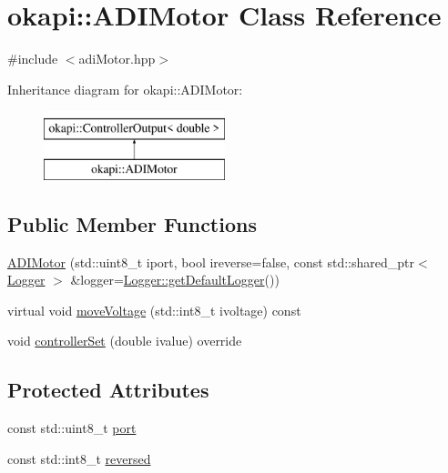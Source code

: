 \hypertarget{classokapi_1_1ADIMotor}{}\section{okapi\+::A\+D\+I\+Motor Class Reference}
\label{classokapi_1_1ADIMotor}


{\ttfamily \#include $<$adi\+Motor.\+hpp$>$}

Inheritance diagram for okapi\+::A\+D\+I\+Motor\+:\begin{figure}[H]
\begin{center}
\leavevmode
\includegraphics[height=2.000000cm]{classokapi_1_1ADIMotor}
\end{center}
\end{figure}
\subsection*{Public Member Functions}
\begin{DoxyCompactItemize}
\item 
\mbox{\hyperlink{classokapi_1_1ADIMotor_a44abc0f7804cc45e2ad98a54d4fea920}{A\+D\+I\+Motor}} (std\+::uint8\+\_\+t iport, bool ireverse=false, const std\+::shared\+\_\+ptr$<$ \mbox{\hyperlink{classokapi_1_1Logger}{Logger}} $>$ \&logger=\mbox{\hyperlink{classokapi_1_1Logger_a5053cf778b4b55acba788a3797dc96d2}{Logger\+::get\+Default\+Logger}}())
\item 
virtual void \mbox{\hyperlink{classokapi_1_1ADIMotor_a4c992efbe21467c0339308fba926b1a6}{move\+Voltage}} (std\+::int8\+\_\+t ivoltage) const
\item 
void \mbox{\hyperlink{classokapi_1_1ADIMotor_ac290a47e904c728ff1e61ee85408a1be}{controller\+Set}} (double ivalue) override
\end{DoxyCompactItemize}
\subsection*{Protected Attributes}
\begin{DoxyCompactItemize}
\item 
const std\+::uint8\+\_\+t \mbox{\hyperlink{classokapi_1_1ADIMotor_aae748af2c07c58821db34dff7924f4b7}{port}}
\item 
const std\+::int8\+\_\+t \mbox{\hyperlink{classokapi_1_1ADIMotor_a3abbe2875ba0abb35297d8dbe91cd4f4}{reversed}}
\end{DoxyCompactItemize}


